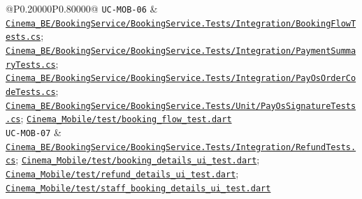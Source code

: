 \begin{longtable}{@{}P{0.20000\SRSWidth}P{0.80000\SRSWidth}@{}}
\texttt{UC-\allowbreak{}MOB-\allowbreak{}06} & \href{../../../Cinema\_BE/BookingService/BookingService.Tests/Integration/BookingFlowTests.cs}{\texttt{Cinema\_\allowbreak{}BE/\allowbreak{}Booking\allowbreak{}Service/\allowbreak{}Booking\allowbreak{}Service.\allowbreak{}Tests/\allowbreak{}Integrat\allowbreak{}ion/\allowbreak{}Booking\allowbreak{}Flow\allowbreak{}Tests.\allowbreak{}cs}}; \href{../../../Cinema\_BE/BookingService/BookingService.Tests/Integration/PaymentSummaryTests.cs}{\texttt{Cinema\_\allowbreak{}BE/\allowbreak{}Booking\allowbreak{}Service/\allowbreak{}Booking\allowbreak{}Service.\allowbreak{}Tests/\allowbreak{}Integrat\allowbreak{}ion/\allowbreak{}Payment\allowbreak{}Summary\allowbreak{}Tests.\allowbreak{}cs}}; \href{../../../Cinema\_BE/BookingService/BookingService.Tests/Integration/PayOsOrderCodeTests.cs}{\texttt{Cinema\_\allowbreak{}BE/\allowbreak{}Booking\allowbreak{}Service/\allowbreak{}Booking\allowbreak{}Service.\allowbreak{}Tests/\allowbreak{}Integrat\allowbreak{}ion/\allowbreak{}Pay\allowbreak{}Os\allowbreak{}Order\allowbreak{}Code\allowbreak{}Tests.\allowbreak{}cs}}; \href{../../../Cinema\_BE/BookingService/BookingService.Tests/Unit/PayOsSignatureTests.cs}{\texttt{Cinema\_\allowbreak{}BE/\allowbreak{}Booking\allowbreak{}Service/\allowbreak{}Booking\allowbreak{}Service.\allowbreak{}Tests/\allowbreak{}Unit/\allowbreak{}Pay\allowbreak{}Os\allowbreak{}Signatur\allowbreak{}e\allowbreak{}Tests.\allowbreak{}cs}}; \href{../../../Cinema\_Mobile/test/booking\_flow\_test.dart}{\texttt{Cinema\_\allowbreak{}Mobile/\allowbreak{}test/\allowbreak{}booking\_\allowbreak{}flow\_\allowbreak{}test.\allowbreak{}dart}} \\[3pt]
\texttt{UC-\allowbreak{}MOB-\allowbreak{}07} & \href{../../../Cinema\_BE/BookingService/BookingService.Tests/Integration/RefundTests.cs}{\texttt{Cinema\_\allowbreak{}BE/\allowbreak{}Booking\allowbreak{}Service/\allowbreak{}Booking\allowbreak{}Service.\allowbreak{}Tests/\allowbreak{}Integrat\allowbreak{}ion/\allowbreak{}Refund\allowbreak{}Tests.\allowbreak{}cs}}; \href{../../../Cinema\_Mobile/test/booking\_details\_ui\_test.dart}{\texttt{Cinema\_\allowbreak{}Mobile/\allowbreak{}test/\allowbreak{}booking\_\allowbreak{}details\_\allowbreak{}ui\_\allowbreak{}test.\allowbreak{}dart}}; \href{../../../Cinema\_Mobile/test/refund\_details\_ui\_test.dart}{\texttt{Cinema\_\allowbreak{}Mobile/\allowbreak{}test/\allowbreak{}refund\_\allowbreak{}details\_\allowbreak{}ui\_\allowbreak{}test.\allowbreak{}dart}}; \href{../../../Cinema\_Mobile/test/staff\_booking\_details\_ui\_test.dart}{\texttt{Cinema\_\allowbreak{}Mobile/\allowbreak{}test/\allowbreak{}staff\_\allowbreak{}booking\_\allowbreak{}details\_\allowbreak{}ui\_\allowbreak{}test.\allowbreak{}dart}} \\[3pt]

\end{longtable}

